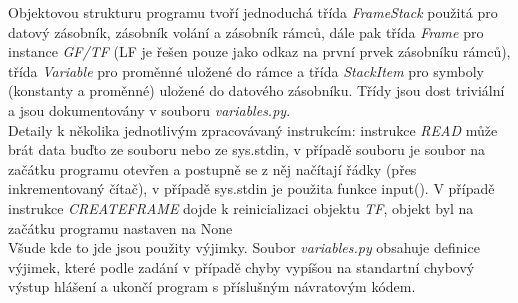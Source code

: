 \documentclass[10pt]{article}
\begin{document}
Objektovou strukturu programu tvoří jednoduchá třída \textit{FrameStack} použitá pro datový zásobník, zásobník volání a zásobník rámců, dále pak třída \textit{Frame} pro instance \textit{GF/TF} (LF je řešen pouze jako odkaz na první prvek zásobníku rámců), třída \textit{Variable} pro proměnné uložené do rámce a třída \textit{StackItem} pro symboly (konstanty a proměnné) uložené do datového zásobníku. Třídy jsou dost triviální a jsou dokumentovány v souboru \textit{variables.py}.\\
Detaily k několika jednotlivým zpracovávaný instrukcím: instrukce \textit{READ} může brát data buďto ze souboru nebo ze sys.stdin, v případě souboru je soubor na začátku programu otevřen a postupně se z něj načítají řádky (přes inkrementovaný čítač), v případě sys.stdin je použita funkce input(). V případě instrukce \textit{CREATEFRAME} dojde k reinicializaci objektu \textit{TF}, objekt byl na začátku programu nastaven na None\\
Všude kde to jde jsou použity výjimky. Soubor \textit{variables.py} obsahuje definice výjimek, které podle zadání v případě chyby vypíšou na standartní chybový výstup hlášení a ukončí program s příslušným návratovým kódem. 
\end{document}
